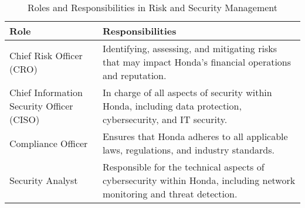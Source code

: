 \begin{table}[h!]
\centering
\begin{tabular}{|l|p{10cm}|}
\hline
\textbf{Role} & \textbf{Responsibilities} \\
\hline
Chief Risk Officer (CRO) & Identifying, assessing, and mitigating risks that may impact Honda's financial operations and reputation.\\
\hline
Chief Information Security Officer (CISO)& In charge of all aspects of security within Honda, including data protection, cybersecurity, and IT security.\\
\hline
Compliance Officer & Ensures that Honda adheres to all applicable laws, regulations, and industry standards.\\
\hline
Security Analyst & Responsible for the technical aspects of cybersecurity within Honda, including network monitoring and threat detection.\\
\hline
\end{tabular}
\caption{Roles and Responsibilities in Risk and Security Management}
\end{table}


